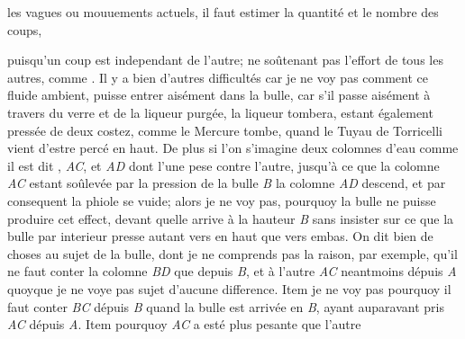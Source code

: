 les vagues ou mouuements actuels, il faut estimer la quantit\'{e} et le nombre des coups,\rule[-0.5cm]{0cm}{0.5cm} puisqu'un coup est independant de l'autre; ne so\^{u}tenant pas l'effort de tous les autres, comme  .
\pend
\pstart Il y a bien d'autres difficult\'{e}s car je ne voy pas comment ce fluide ambient, puisse entrer ais\'{e}ment dans la bulle, car s'il passe ais\'{e}ment \`{a} travers du verre et de la liqueur purg\'{e}e\protect{}, la liqueur tombera, estant \'{e}galement press\'{e}e de deux costez, comme le Mercure\protect{} tombe, quand le Tuyau de\protect{}  Torricelli vient d'estre perc\'{e} en haut. De plus si l'on s'imagine deux colomnes d'eau comme il est dit , \textit{AC}, et \textit{AD} dont l'une pese contre l'autre, jusqu'\`{a} ce que la colomne \textit{AC} estant so\^{u}lev\'{e}e par la pression de la bulle \textit{B} la colomne \textit{AD} descend, et par consequent la phiole se vuide; alors je ne voy pas, pourquoy la bulle ne puisse produire cet effect, devant quelle arrive \`{a} la hauteur \textit{B} sans insister sur ce que la bulle par  interieur presse autant vers en haut que vers embas. On dit bien de choses  au sujet de la bulle, dont je ne comprends pas la raison, par exemple, qu'il ne faut conter la colomne \textit{BD} que depuis \textit{B}, et \`{a} l'autre \textit{AC} neantmoins d\'{e}puis \textit{A} quoyque je ne voye pas sujet d'aucune difference. Item je ne voy pas pourquoy il faut conter \textit{BC} d\'{e}puis \textit{B} quand la bulle est arriv\'{e}e en \textit{B}, ayant auparavant pris \textit{AC} d\'{e}puis \textit{A}. Item pourquoy  \textit{AC} a est\'{e} plus pesante que l'autre